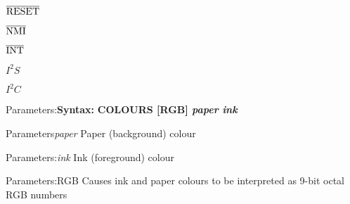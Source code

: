 \documentclass[11pt]{book}
\def\lthtmlcheckvsize{\ifdim\ht\sizebox<\vsize 
  \ifdim\wd\sizebox<\hsize\expandafter\hfill\fi \expandafter\vfill
  \else\expandafter\vss\fi}%
\begin{document}
{\newpage\clearpage
{}%
\begin{table}\centering
  
\end{table}%
\lthtmlfigureZ
\lthtmlcheckvsize\clearpage}

{\newpage\clearpage
{}%
$\overline{\hbox{RESET}}$%
\lthtmlindisplaymathZ
\lthtmlcheckvsize\clearpage}

{\newpage\clearpage
{}%
$\overline{\hbox{NMI}}$%
\lthtmlindisplaymathZ
\lthtmlcheckvsize\clearpage}

{\newpage\clearpage
{}%
$\overline{\hbox{INT}}$%
\lthtmlindisplaymathZ
\lthtmlcheckvsize\clearpage}

{\newpage\clearpage
{}%
$I^2S$%
\lthtmlindisplaymathZ
\lthtmlcheckvsize\clearpage}

{\newpage\clearpage
{}%
$I^2C$%
\lthtmlindisplaymathZ
\lthtmlcheckvsize\clearpage}

{\newpage\clearpage
{}%
\begin{labeledpar}{Parameters:}{\textbf{Syntax:}}
\textbf{COLOURS [RGB] \textit{paper} \textit{ink}}
\end{labeledpar}%
\lthtmlfigureZ
\lthtmlcheckvsize\clearpage}

{\newpage\clearpage
{}%
\begin{labeledpar}{Parameters}{\textit{paper}}
  Paper (background) colour
\end{labeledpar}%
\lthtmlfigureZ
\lthtmlcheckvsize\clearpage}

{\newpage\clearpage
{}%
\begin{labeledpar}{Parameters:}{\textit{ink}}
  Ink (foreground) colour
\end{labeledpar}%
\lthtmlfigureZ
\lthtmlcheckvsize\clearpage}

{\newpage\clearpage
{}%
\begin{labeledpar}{Parameters:}{RGB}
  Causes ink and paper colours to be interpreted as 9-bit octal RGB numbers
\end{labeledpar}%
\lthtmlfigureZ
\lthtmlcheckvsize\clearpage}
\end{document}
